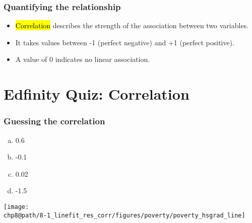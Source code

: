 \documentclass[slidestop,compress,mathserif]{beamer}
\makeatletter
\def\chp8@path{../../Chp 8}
\makeatother
\begin{document}
\begin{frame}
\frametitle{Quantifying the relationship}

\begin{itemize}

\item \hl{Correlation} describes the strength of the  association between two variables.

\pause

\item It takes values between -1 (perfect negative) and +1 (perfect positive).

\pause

\item A value of 0 indicates no linear association.

\end{itemize}

\end{frame}


\section{Edfinity Quiz: Correlation}


\begin{frame}
\frametitle{Guessing the correlation}

{
\begin{enumerate}[(a)]
\item 0.6
\item -0.1
\item 0.02
\item -1.5
\end{enumerate}
}
{
\begin{center}
\texttt{[image: \\chp8@path/8-1\_linefit\_res\_corr/figures/poverty/poverty\_hsgrad\_line]}
\end{center}
}

\end{frame}

\end{document}
